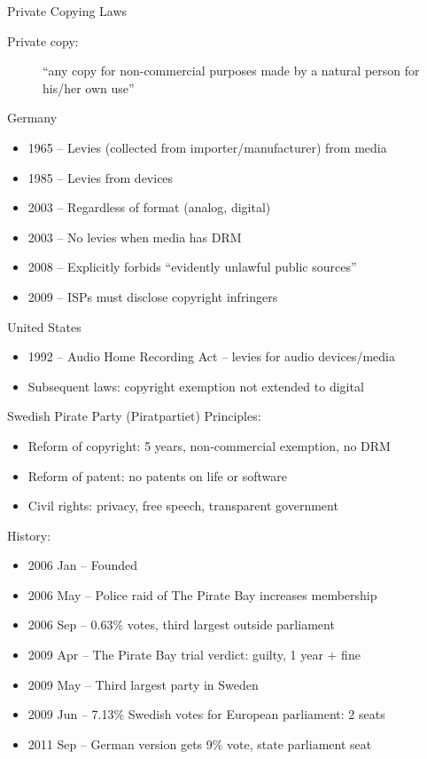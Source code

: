 \documentclass{beamer}
\begin{document}
\begin{frame}{Private Copying Laws}
\begin{description}
\item[Private copy:] ``any copy for non-commercial purposes made by a natural person for his/her own use''
\end{description}

Germany
\begin{itemize}
\item 1965 -- Levies (collected from importer/manufacturer) from media
\item 1985 -- Levies from devices
\item 2003 -- Regardless of format (analog, digital)
\item 2003 -- No levies when media has DRM
\item 2008 -- Explicitly forbids ``evidently unlawful public sources''
\item 2009 -- ISPs must disclose copyright infringers
\end{itemize}

\bigskip
United States
\begin{itemize}
\item 1992 -- Audio Home Recording Act -- levies for audio devices/media
\item Subsequent laws: copyright exemption not extended to digital
\end{itemize}
\end{frame}

\begin{frame}{Swedish Pirate Party (Piratpartiet)}
Principles:
\begin{itemize}
\item Reform of copyright: 5 years, non-commercial exemption, no DRM
\item Reform of patent: no patents on life or software
\item Civil rights: privacy, free speech, transparent government
\end{itemize}
History:
\begin{itemize}
\item 2006 Jan -- Founded
\item 2006 May -- Police raid of The Pirate Bay increases membership
\item 2006 Sep -- 0.63\% votes, third largest outside parliament
\item 2009 Apr -- The Pirate Bay trial verdict: guilty, 1 year + fine
\item 2009 May -- Third largest party in Sweden
\item 2009 Jun -- 7.13\% Swedish votes for European parliament: 2 seats
\item 2011 Sep -- German version gets 9\% vote, state parliament seat
\end{itemize}
\end{frame}
\end{document}
